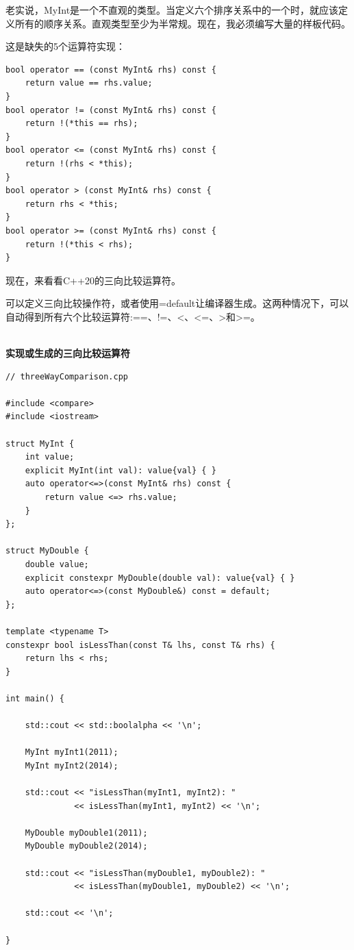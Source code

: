 老实说，MyInt是一个不直观的类型。当定义六个排序关系中的一个时，就应该定义所有的顺序关系。直观类型至少为半常规。现在，我必须编写大量的样板代码。

这是缺失的5个运算符实现：

\begin{lstlisting}[style=styleCXX]
bool operator == (const MyInt& rhs) const {
	return value == rhs.value;
}
bool operator != (const MyInt& rhs) const {
	return !(*this == rhs);
}
bool operator <= (const MyInt& rhs) const {
	return !(rhs < *this);
}
bool operator > (const MyInt& rhs) const {
	return rhs < *this;
}
bool operator >= (const MyInt& rhs) const {
	return !(*this < rhs);
}
\end{lstlisting}

现在，来看看C++20的三向比较运算符。


可以定义三向比较操作符，或者使用=default让编译器生成。这两种情况下，可以自动得到所有六个比较运算符:==、!=、<、<=、>和>=。

\hspace*{\fill} \\ %
\noindent
\textbf{实现或生成的三向比较运算符}
\begin{lstlisting}[style=styleCXX]
// threeWayComparison.cpp

#include <compare>
#include <iostream>

struct MyInt {
	int value;
	explicit MyInt(int val): value{val} { }
	auto operator<=>(const MyInt& rhs) const {
		return value <=> rhs.value;
	}
};

struct MyDouble {
	double value;
	explicit constexpr MyDouble(double val): value{val} { }
	auto operator<=>(const MyDouble&) const = default;
};

template <typename T>
constexpr bool isLessThan(const T& lhs, const T& rhs) {
	return lhs < rhs;
}

int main() {

	std::cout << std::boolalpha << '\n';
	
	MyInt myInt1(2011);
	MyInt myInt2(2014);
	
	std::cout << "isLessThan(myInt1, myInt2): "
	          << isLessThan(myInt1, myInt2) << '\n';
	
	MyDouble myDouble1(2011);
	MyDouble myDouble2(2014);
	
	std::cout << "isLessThan(myDouble1, myDouble2): "
	          << isLessThan(myDouble1, myDouble2) << '\n';
	
	std::cout << '\n';

}
\end{lstlisting}


